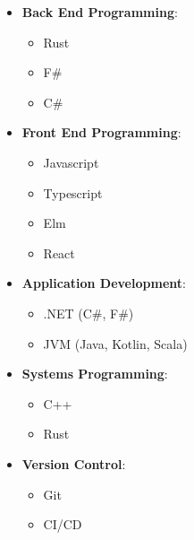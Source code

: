 \documentclass[11pt, twoside, a4paper]{article}
\newlength{\cvSideWidth}
\begin{document}
\begin{minipage}[t]{\cvSideWidth}
\begin{center}
        \vspace*{0.5cm}

        \begin{flushleft}
            \begin{itemize}
                \item \textbf{Back End Programming}:
                \begin{itemize}
                    \item Rust 
                    \item F\# 
                    \item C\# 
                \end{itemize}

                \item \textbf{Front End Programming}:
                \begin{itemize}
                    \item Javascript
                    \item Typescript
                    \item Elm
                    \item React
                \end{itemize}
                
                \item \textbf{Application Development}:
                \begin{itemize}
                    \item .NET (C\#, F\#)
                    \item JVM (Java, Kotlin, Scala)
                \end{itemize}
                
                \item \textbf{Systems Programming}:
                \begin{itemize}
                    \item C++
                    \item Rust
                \end{itemize}

                \item \textbf{Version Control}:
                \begin{itemize}
                    \item Git
                    \item CI/CD
                \end{itemize}


\end{itemize}
\end{flushleft}
\end{center}
\end{minipage}
\end{document}
